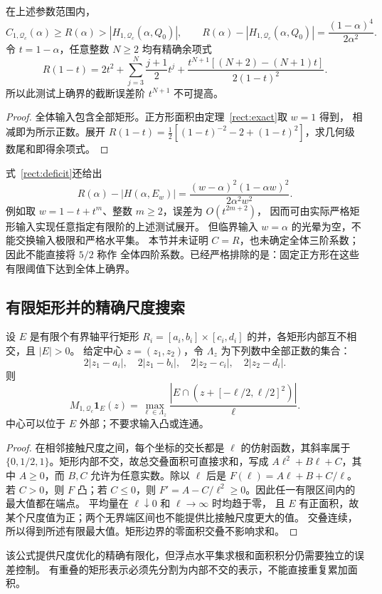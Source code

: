\begin{corollary}[更强的全体下界与任意阶测试展开]\label{rect:orders}
在上述参数范围内，
\[
 C_{1,\mathcal Q_c}(\alpha)\ge R(\alpha)
 >|H_{1,\mathcal Q_c}(\alpha,Q_0)|,
 \qquad
 R(\alpha)-|H_{1,\mathcal Q_c}(\alpha,Q_0)|
 =\frac{(1-\alpha)^4}{2\alpha^2}.
\]
令 $t=1-\alpha$，任意整数 $N\ge2$ 均有精确余项式
\begin{equation}\label{rect:all-orders}
 R(1-t)=2t^2+\sum_{j=3}^N\frac{j+1}{2}t^j
 +\frac{t^{N+1}[(N+2)-(N+1)t]}{2(1-t)^2}.
\end{equation}
所以此测试上确界的截断误差阶 $t^{N+1}$ 不可提高。
\end{corollary}
\begin{proof}
全体输入包含全部矩形。正方形面积由定理~\ref{rect:exact}取 $w=1$ 得到，
相减即为所示正数。展开
$R(1-t)=\tfrac12[(1-t)^{-2}-2+(1-t)^2]$，求几何级数尾和即得余项式。
\end{proof}

\begin{remark}[可达到的测试序列与量词]\label{rect:scope}
式~\eqref{rect:deficit}还给出
\[
 R(\alpha)-|H(\alpha,E_w)|
 =\frac{(w-\alpha)^2(1-\alpha w)^2}{2\alpha^2w^2}.
\]
例如取 $w=1-t+t^m$、整数 $m\ge2$，误差为 $O(t^{2m+2})$，
因而可由实际严格矩形输入实现任意指定有限阶的上述测试展开。
但临界输入 $w=\alpha$ 的光晕为空，不能交换输入极限和严格水平集。
本节并未证明 $C=R$，也未确定全体三阶系数；因此不能直接将 $5/2$ 称作
全体四阶系数。已经严格排除的是：固定正方形在这些有限阈值下达到全体上确界。
\end{remark}

\subsection{有限矩形并的精确尺度搜索}
\begin{proposition}[二维半阶的有限尺度公式]\label{rect:union-scales}
设 $E$ 是有限个有界轴平行矩形
$R_i=[a_i,b_i]\times[c_i,d_i]$ 的并，各矩形内部互不相交，且 $|E|>0$。
给定中心 $z=(z_1,z_2)$，令 $\Lambda_z$ 为下列数中全部正数的集合：
\[
 2|z_1-a_i|,\quad2|z_1-b_i|,\quad2|z_2-c_i|,\quad2|z_2-d_i|.
\]
则
\[
 M_{1,\mathcal Q_c}\mathbf1_E(z)
 =\max_{\ell\in\Lambda_z}\frac{|E\cap(z+[-\ell/2,\ell/2]^2)|}{\ell}.
\]
中心可以位于 $E$ 外部；不要求输入凸或连通。
\end{proposition}
\begin{proof}
在相邻接触尺度之间，每个坐标的交长都是 $\ell$ 的仿射函数，其斜率属于
$\{0,1/2,1\}$。矩形内部不交，故总交叠面积可直接求和，写成
$A\ell^2+B\ell+C$，其中 $A\ge0$，而 $B,C$ 允许为任意实数。除以 $\ell$ 后是
$F(\ell)=A\ell+B+C/\ell$。若 $C>0$，则 $F$ 凸；若 $C\le0$，则
$F'=A-C/\ell^2\ge0$。因此任一有限区间内的最大值都在端点。
平均量在 $\ell\downarrow0$ 和 $\ell\to\infty$ 时均趋于零，
且 $E$ 有正面积，故某个尺度值为正；两个无界端区间也不能提供比接触尺度更大的值。
交叠连续，所以得到所述有限最大值。矩形边界的零面积交叠不影响求和。
\end{proof}

该公式提供尺度优化的精确有限化，但浮点水平集求根和面积积分仍需要独立的误差控制。
有重叠的矩形表示必须先分割为内部不交的表示，不能直接重复累加面积。
